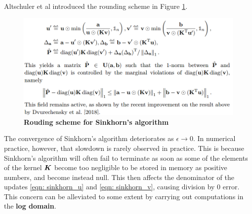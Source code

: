 \documentclass[11pt]{article}
\begin{document}
Altschuler et al introduced the rounding scheme in Figure \ref{fig: sinkhorn_rounding_scheme}.
\begin{figure}
\begin{minipage}[t]{1\linewidth}
  \centering
  \centerline{\includegraphics[scale = 0.4]{sinkhorn_rounding_scheme.png}}
\end{minipage}
\caption{\footnotesize{\textbf{Rouding scheme for Sinkhorn's algorithm}}}
\label{fig: sinkhorn_rounding_scheme}
\end{figure}

The convergence of Sinkhorn’s algorithm deteriorates as $\epsilon \rightarrow 0$. In numerical practice, however, that slowdown is rarely observed in practice. This is because Sinkhorn’s algorithm will often fail to terminate as soon as some of the elements of the kernel $\boldsymbol{K}$ become too negligible to be stored in memory as positive numbers, and
become instead null. This then affects the denominator of the updates \eqref{eqn: sinkhorn_u} and \eqref{eqn: sinkhorn_v}, causing division by $0$ error. This concern can be alleviated to some extent by carrying out computations in the \textbf{log domain}. 
\end{document}
